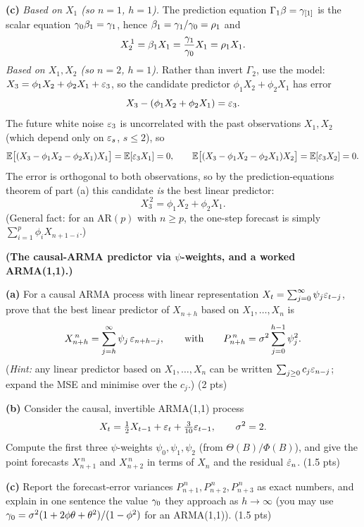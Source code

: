 \documentclass[11pt]{article}
\begin{document}
\textbf{(c)} \emph{Based on $X_1$ (so $n=1$, $h=1$).} The prediction equation $\Gamma_1\beta=\gamma_{[1]}$ is the scalar equation $\gamma_0\beta_1=\gamma_1$, hence $\beta_1=\gamma_1/\gamma_0=\rho_1$ and
\[
X^{\,1}_2=\beta_1X_1=\frac{\gamma_1}{\gamma_0}X_1=\rho_1 X_1 .
\]
\emph{Based on $X_1,X_2$ (so $n=2$, $h=1$).} Rather than invert $\Gamma_2$, use the model: $X_3=\phi_1X_2+\phi_2X_1+\varepsilon_3$, so the candidate predictor $\phi_1X_2+\phi_2X_1$ has error
\[
X_3-(\phi_1X_2+\phi_2X_1)=\varepsilon_3 .
\]
The future white noise $\varepsilon_3$ is uncorrelated with the past observations $X_1,X_2$ (which depend only on $\varepsilon_s$, $s\le2$), so
\[
\mathbb{E}\bigl[(X_3-\phi_1X_2-\phi_2X_1)X_1\bigr]=\mathbb{E}[\varepsilon_3X_1]=0,
\qquad
\mathbb{E}\bigl[(X_3-\phi_1X_2-\phi_2X_1)X_2\bigr]=\mathbb{E}[\varepsilon_3X_2]=0 .
\]
The error is orthogonal to both observations, so by the prediction-equations theorem of part (a) this candidate \emph{is} the best linear predictor:
\[
X^{\,2}_3=\phi_1X_2+\phi_2X_1 .
\]
(General fact: for an AR$(p)$ with $n\ge p$, the one-step forecast is simply $\sum_{i=1}^p\phi_iX_{n+1-i}$.)

\statementstart
\textbf{(The causal-ARMA predictor via $\psi$-weights, and a worked ARMA(1,1).)}

\textbf{(a)} For a causal ARMA process with linear representation $X_t=\sum_{j=0}^\infty\psi_j\varepsilon_{t-j}$, prove that the best linear predictor of $X_{n+h}$ based on $X_1,\dots,X_n$ is
\[
X^{\,n}_{n+h}=\sum_{j=h}^{\infty}\psi_j\,\varepsilon_{n+h-j},
\qquad\text{with}\qquad
P^{\,n}_{n+h}=\sigma^2\sum_{j=0}^{h-1}\psi_j^2 .
\]
(\emph{Hint:} any linear predictor based on $X_1,\dots,X_n$ can be written $\sum_{j\ge0}c_j\varepsilon_{n-j}$; expand the MSE and minimise over the $c_j$.) \hfill(2 pts)

\textbf{(b)} Consider the causal, invertible ARMA(1,1) process
\[
X_t=\tfrac12 X_{t-1}+\varepsilon_t+\tfrac{3}{10}\varepsilon_{t-1},\qquad \sigma^2=2 .
\]
Compute the first three $\psi$-weights $\psi_0,\psi_1,\psi_2$ (from $\Theta(B)/\Phi(B)$), and give the point forecasts $X^{\,n}_{n+1}$ and $X^{\,n}_{n+2}$ in terms of $X_n$ and the residual $\hat{\varepsilon}_n$. \hfill(1.5 pts)

\textbf{(c)} Report the forecast-error variances $P^{\,n}_{n+1},P^{\,n}_{n+2},P^{\,n}_{n+3}$ as exact numbers, and explain in one sentence the value $\gamma_0$ they approach as $h\to\infty$ (you may use $\gamma_0=\sigma^2(1+2\phi\theta+\theta^2)/(1-\phi^2)$ for an ARMA(1,1)). \hfill(1.5 pts)
\statementend
\end{document}
